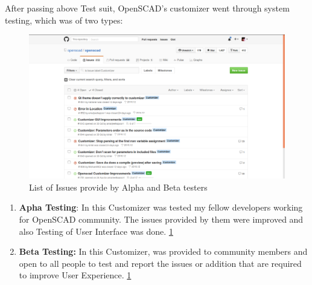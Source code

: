 After passing above Test suit, OpenSCAD's customizer went through system testing, which was of two types:
\begin{figure}
\centering
\includegraphics[width=\linewidth]{images/Issues}
\caption{List of Issues provide by Alpha and Beta testers}
\label{fig:Issues}
\end{figure}

\begin{enumerate}
    \item \textbf{Apha Testing}: In this Customizer was tested my fellow developers working for OpenSCAD community. The issues provided by them were improved and also Testing of User Interface was done. \ref{fig:Issues}
   
    \item \textbf{Beta Testing:} In this Customizer, was provided to community members and open to all people to test and report the issues or addition that are required to improve User Experience. \ref{fig:Issues}
   
\end{enumerate}


